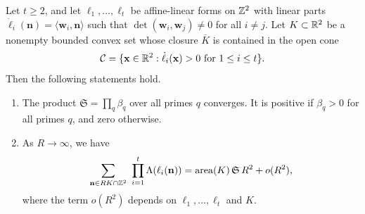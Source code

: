 \begin{theorem}\label{thm:gtz}
Let $t\ge2$, and let $\ell_1,\dots,\ell_t$ be affine-linear forms on $\mathbb Z^2$ with linear parts $\dot\ell_i(\mathbf n)=\langle\mathbf w_i,\mathbf n\rangle$ such that $\det(\mathbf w_i,\mathbf w_j)\ne0$ for all $i\ne j$. Let $K\subset\mathbb R^2$ be a nonempty bounded convex set whose closure $\overline K$ is contained in the open cone
\[
\mathcal C=\{\mathbf x\in\mathbb R^2:\dot\ell_i(\mathbf x)>0\text{ for }1\le i\le t\}.
\]
Then the following statements hold.
\begin{enumerate}[label=(\arabic*)]
\item\label{item:gtz-product} The product $\mathfrak S=\prod_q\beta_q$ over all primes $q$ converges. It is positive if $\beta_q>0$ for all primes $q$, and zero otherwise.
\item\label{item:gtz-asymptotic} As $R\to\infty$, we have
\begin{equation}\label{eq:gtz}
\sum_{\mathbf n\in RK\cap\mathbb Z^2}\ \prod_{i=1}^t\Lambda(\ell_i(\mathbf n))=\operatorname{area}(K)\,\mathfrak S\,R^2+o(R^2),
\end{equation}
where the term $o(R^2)$ depends on $\ell_1,\dots,\ell_t$ and $K$.
\end{enumerate}
\end{theorem}

